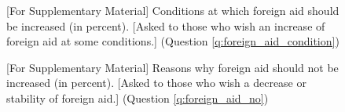 \begin{figure}[h!]
  \caption[Conditions at which foreign aid should be increased]{[For Supplementary Material] Conditions at which foreign aid should be increased (in percent). [Asked to those who wish an increase of foreign aid at some conditions.] (Question \ref{q:foreign_aid_condition})}\label{fig:foreign_aid_condition}
\end{figure}

\begin{figure}[h!]
  \caption[Reasons why foreign aid should not be increased]{[For Supplementary Material] Reasons why foreign aid should not be increased (in percent). [Asked to those who wish a decrease or stability of foreign aid.] (Question \ref{q:foreign_aid_no})}\label{fig:foreign_aid_no}
\end{figure}

